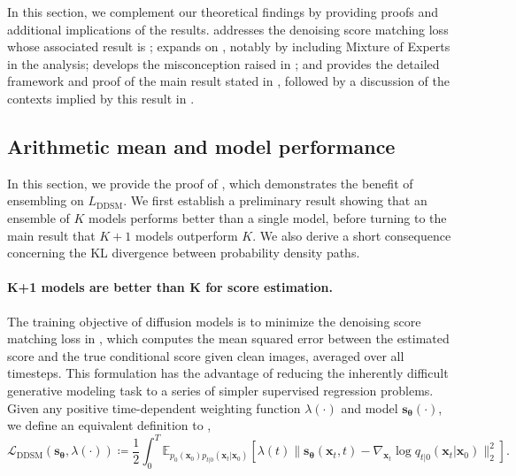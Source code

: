 \documentclass[10pt]{article} %
\newcommand{\DDSM}{\text{DDSM}}
\def\rvx{{\mathbf{x}}}
\def\vtheta{{\bm{\theta}}}
\def\vs{{\bm{s}}}
\begin{document}
In this section, we complement our theoretical findings by providing proofs and additional implications of the results.  addresses the denoising score matching loss whose associated result is ;  expands on , notably by including Mixture of Experts in the analysis;  develops the misconception raised in ; and  provides the detailed framework and proof of the main result stated in , followed by a discussion of the contexts implied by this result in .

\subsection{Arithmetic mean and model performance}\label{app: arithmetic mean theoretical results}

In this section, we provide the proof of , 
which demonstrates the benefit of ensembling on $L_\DDSM$. We first establish a preliminary result showing that an ensemble of $K$ models performs better than a single model, before turning to the main result that $K{+}1$ models outperform $K$. 
We also derive a short consequence concerning the KL divergence between probability density paths.

\paragraph{K+1 models are better than K for score estimation.} 

The training objective of diffusion models is to minimize the denoising score matching loss in , which computes the mean squared error between the estimated score and the true conditional score given clean images, averaged over all timesteps. This formulation has the advantage of reducing the inherently difficult generative modeling task to a series of simpler supervised regression problems. Given any positive time-dependent weighting function $\lambda(\cdot)$ and model $\vs_\vtheta(\cdot)$, we define an equivalent definition to ,
\begin{equation}
\mathcal{L}_\DDSM(\vs_\vtheta,\lambda(\cdot)) \coloneqq \frac{1}{2} \int_0^T  \mathbb{E}_{p_0(\rvx_0)p_{t|0}(\rvx_t|\rvx_0)}\left[\lambda(t) \| \vs_{\vtheta} (\rvx_t,t) - \nabla_{\rvx_t} \log q_{t|0} (\rvx_t | \rvx_0) \|^2_2\right].
\end{equation}
\end{document}

